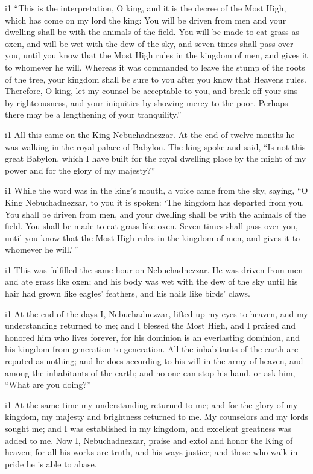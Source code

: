 \begin{paracol}{2}
\begin{otherlanguage}{english}
i1  ``This is the interpretation, O king, and it is the
decree of the Most High, which has come on my lord the king:
 You will be driven from men and your dwelling shall be
with the animals of the field. You will be made to eat grass as oxen,
and will be wet with the dew of the sky, and seven times shall pass over
you, until you know that the Most High rules in the kingdom of men, and
gives it to whomever he will.  Whereas it was commanded
to leave the stump of the roots of the tree, your kingdom shall be sure
to you after you know that Heavens rules.  Therefore, O
king, let my counsel be acceptable to you, and break off your sins by
righteousness, and your iniquities by showing mercy to the poor. Perhaps
there may be a lengthening of your tranquility.''

i1  All this came on the King Nebuchadnezzar.
 At the end of twelve months he was walking in the royal
palace of Babylon.  The king spoke and said, ``Is not
this great Babylon, which I have built for the royal dwelling place by
the might of my power and for the glory of my majesty?''

i1  While the word was in the king's mouth, a voice came
from the sky, saying, ``O King Nebuchadnezzar, to you it is spoken: `The
kingdom has departed from you.  You shall be driven from
men, and your dwelling shall be with the animals of the field. You shall
be made to eat grass like oxen. Seven times shall pass over you, until
you know that the Most High rules in the kingdom of men, and gives it to
whomever he will.'\,''

i1  This was fulfilled the same hour on Nebuchadnezzar.
He was driven from men and ate grass like oxen; and his body was wet
with the dew of the sky until his hair had grown like eagles' feathers,
and his nails like birds' claws.

i1  At the end of the days I, Nebuchadnezzar, lifted up
my eyes to heaven, and my understanding returned to me; and I blessed
the Most High, and I praised and honored him who lives forever, for his
dominion is an everlasting dominion, and his kingdom from generation to
generation.  All the inhabitants of the earth are reputed
as nothing; and he does according to his will in the army of heaven, and
among the inhabitants of the earth; and no one can stop his hand, or ask
him, ``What are you doing?''

i1  At the same time my understanding returned to me; and
for the glory of my kingdom, my majesty and brightness returned to me.
My counselors and my lords sought me; and I was established in my
kingdom, and excellent greatness was added to me.  Now I,
Nebuchadnezzar, praise and extol and honor the King of heaven; for all
his works are truth, and his ways justice; and those who walk in pride
he is able to abase.


\end{otherlanguage}
\end{paracol}
